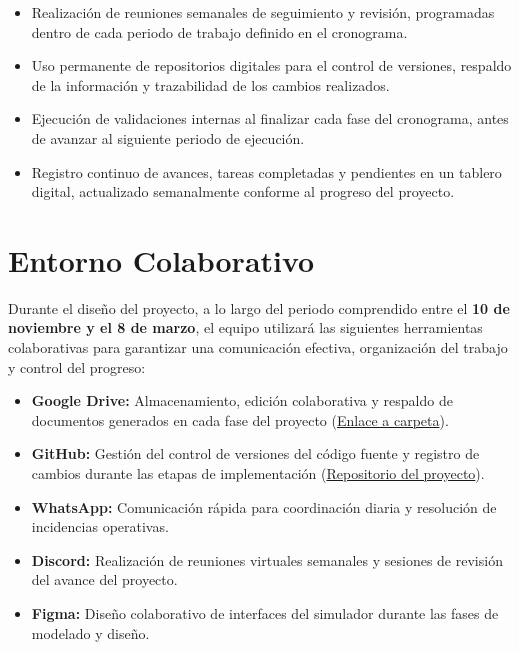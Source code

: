 \documentclass[12pt]{article}
\begin{document}
\begin{itemize}
    \item Realización de reuniones semanales de seguimiento y revisión, programadas dentro de cada periodo de trabajo definido en el cronograma.
    \item Uso permanente de repositorios digitales para el control de versiones, respaldo de la información y trazabilidad de los cambios realizados.
    \item Ejecución de validaciones internas al finalizar cada fase del cronograma, antes de avanzar al siguiente periodo de ejecución.
    \item Registro continuo de avances, tareas completadas y pendientes en un tablero digital, actualizado semanalmente conforme al progreso del proyecto.
\end{itemize}

\section{Entorno Colaborativo}
Durante el diseño del proyecto, a lo largo del periodo comprendido entre el \textbf{10 de noviembre y el 8 de marzo}, el equipo utilizará las siguientes herramientas colaborativas para garantizar una comunicación efectiva, organización del trabajo y control del progreso:

\begin{itemize}
    \item \textbf{Google Drive:} Almacenamiento, edición colaborativa y respaldo de documentos generados en cada fase del proyecto (\href{https://drive.google.com/drive/folders/1wIwta_jG9tcqN2zeTE8UvTDvzfB7c_vB?usp=drive_link}{Enlace a carpeta}).
    \item \textbf{GitHub:} Gestión del control de versiones del código fuente y registro de cambios durante las etapas de implementación (\href{https://github.com/dzamorab2-cloud/Proyecto-Grupal-Ingenieria-de-Requerimiento.git}{Repositorio del proyecto}).
    \item \textbf{WhatsApp:} Comunicación rápida para coordinación diaria y resolución de incidencias operativas.
    \item \textbf{Discord:} Realización de reuniones virtuales semanales y sesiones de revisión del avance del proyecto.
    \item \textbf{Figma:} Diseño colaborativo de interfaces del simulador durante las fases de modelado y diseño.
\end{itemize}
\end{document}
